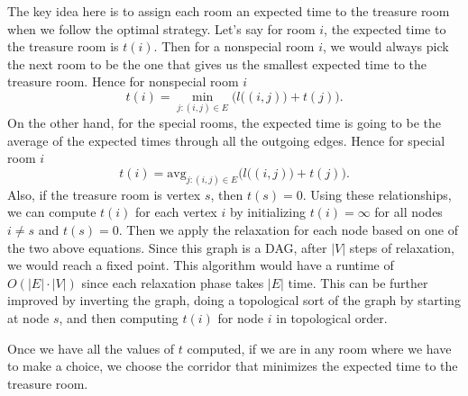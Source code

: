 The key idea here is to assign each room an expected time to the
treasure room
when we follow the optimal strategy. Let's say for room $i$, the
expected time to the treasure room is $t(i)$. Then for a nonspecial room $i$, we
would always pick the next room to be the one that gives us the
smallest expected time to the treasure room. Hence for nonspecial room $i$
\[ t(i) = \min_{j:(i,j) \in E} \Big(l\big((i,j)\big) + t(j)\Big) . \] 
On the other hand, for the special rooms, the expected time is going to
be the average of the expected times through all the outgoing edges. Hence for special room $i$
\[ t(i) = \mbox{avg}_{j:(i,j) \in E} \Big(l\big((i,j)\big) + t(j)\Big) . \] 
Also, if the treasure room is vertex $s$, then $t(s)=0$. Using these
relationships, we can compute $t(i)$ for each vertex $i$ by
initializing $t(i) = \infty$ for all nodes $i\not=s$ and $t(s)= 0$.
Then we apply the relaxation for each node based on one of the two
above equations. Since this graph is a DAG, after $|V|$ steps of
relaxation, we would reach a fixed point. This algorithm would have a
runtime of $O(|E|\cdot|V|)$ since each relaxation phase takes $|E|$
time. This can be further improved by inverting the graph, doing a
topological sort of the graph by starting at node $s$, and then
computing $t(i)$ for node $i$ in topological order. 


Once we have all the values of $t$ computed, if we are in any room where
we have to make a choice, we choose the corridor that minimizes the
expected time to the treasure room. 


